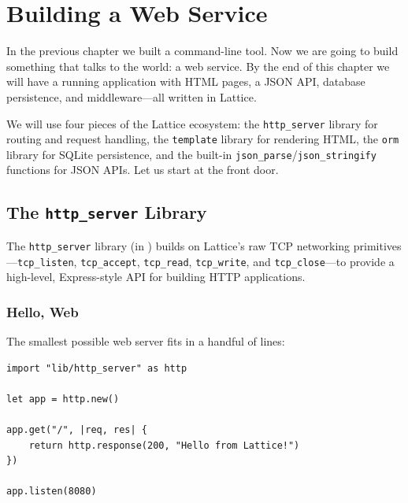 \chapter{Building a Web Service}\label{ch:building-web-service}


In the previous chapter we built a command-line tool.
Now we are going to build something that talks to the world: a web service.
By the end of this chapter we will have a running application with HTML pages, a JSON API, database persistence, and middleware---all written in Lattice.

We will use four pieces of the Lattice ecosystem:
the \lstinline|http_server| library for routing and request handling,
the \lstinline|template| library for rendering HTML,
the \lstinline|orm| library for SQLite persistence,
and the built-in \lstinline|json_parse|/\lstinline|json_stringify| functions for JSON APIs.
Let us start at the front door.

\section{The \texttt{http\_server} Library}\label{sec:http-server-library}


The \lstinline|http_server| library (in ) builds on Lattice's raw TCP networking primitives---\lstinline|tcp_listen|, \lstinline|tcp_accept|, \lstinline|tcp_read|, \lstinline|tcp_write|, and \lstinline|tcp_close|---to provide a high-level, Express-style API for building HTTP applications.

\subsection{Hello, Web}\label{sec:http-hello-web}

The smallest possible web server fits in a handful of lines:

\begin{lstlisting}[language=Lattice, caption={A minimal Lattice web server}]
import "lib/http_server" as http

let app = http.new()

app.get("/", |req, res| {
    return http.response(200, "Hello from Lattice!")
})

app.listen(8080)
\end{lstlisting}

